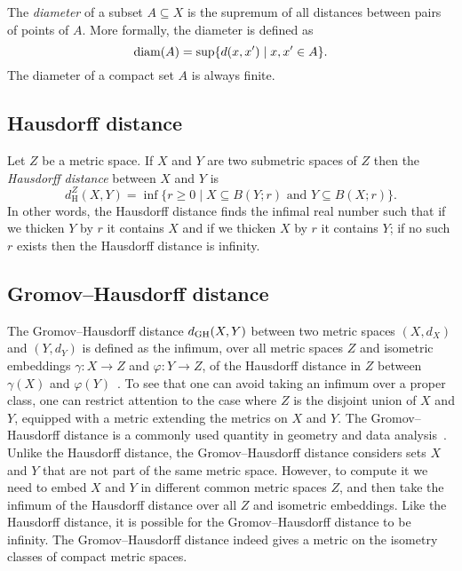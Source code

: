 \documentclass[11pt, reqno, english]{amsart}
\begin{document}
The \emph{diameter} of a subset $A\subseteq X$ is the supremum of all distances between pairs of points of $A$.
More formally, the diameter is defined as
\[\mathrm{diam}(A)=\sup\{d(x,x') \mid x,x'\in A\}.\]
The diameter of a compact set $A$ is always finite.


\subsection*{Hausdorff distance}

Let $Z$ be a metric space.
If $X$ and $Y$ are two submetric spaces of $Z$ then the \emph{Hausdorff distance} between $X$ and $Y$ is
\[d^Z_\mathrm{H}(X,Y)=\inf\{r\geq 0\mid X\subseteq B(Y;r)\text{ and }Y\subseteq B(X;r)\}.\]
In other words, the Hausdorff distance finds the infimal real number such that if we thicken $Y$ by $r$ it contains $X$ and if we thicken $X$ by $r$ it contains $Y$; if no such $r$ exists then the Hausdorff distance is infinity.


\subsection*{Gromov--Hausdorff distance}

The Gromov--Hausdorff distance $d_{\mathrm{GH}}(X,Y)$ between two metric spaces $(X,d_X)$ and $(Y,d_Y)$ is defined as the infimum, over all metric spaces $Z$ and isometric embeddings $\gamma\colon X\to Z$ and $\varphi\colon Y\to Z$, of the Hausdorff distance in $Z$ between $\gamma(X)$ and $\varphi(Y)$~\cite{edwards1975structure,gromov1981groups, gromov1981structures,tuzhilin2016invented}.
To see that one can avoid taking an infimum over a proper class, one can restrict attention to the case where $Z$ is the disjoint union of $X$ and $Y$, equipped with a metric extending the metrics on $X$ and $Y$.
The Gromov--Hausdorff distance is a commonly used quantity in geometry and data analysis~\cite{GH-BU-VR,cheeger1997structure,colding1996large,gromov2007metric,harrison2023quantitative,lim2021gromov,petersen2006riemannian,tuzhilin2020lectures}.
Unlike the Hausdorff distance, the Gromov--Hausdorff distance considers sets $X$ and $Y$ that are not part of the same metric space.
However, to compute it we need to embed $X$ and $Y$ in different common metric spaces $Z$, and then take the infimum of the Hausdorff distance over all $Z$ and isometric embeddings.
Like the Hausdorff distance, it is possible for the Gromov--Hausdorff distance to be infinity.
The Gromov--Hausdorff distance indeed gives a metric on the isometry classes of compact metric spaces.
\end{document}
